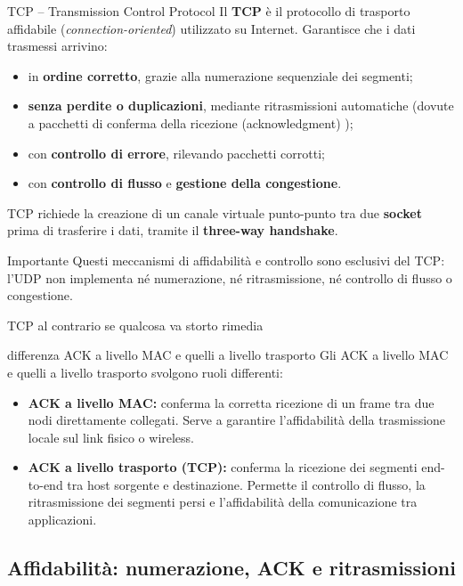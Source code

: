 \documentclass[a4paper,12pt]{report}
\begin{document}
\begin{defbox}{TCP -- Transmission Control Protocol}
Il \textbf{TCP} è il protocollo di trasporto affidabile (\textit{connection-oriented}) utilizzato su Internet.  
Garantisce che i dati trasmessi arrivino:
\begin{itemize}
    \item in \textbf{ordine corretto}, grazie alla numerazione sequenziale dei segmenti;
    \item \textbf{senza perdite o duplicazioni}, mediante ritrasmissioni automatiche (dovute a pacchetti di conferma della ricezione (acknowledgment) );
    \item con \textbf{controllo di errore}, rilevando pacchetti corrotti;
    \item con \textbf{controllo di flusso} e \textbf{gestione della congestione}.
\end{itemize}
TCP richiede la creazione di un canale virtuale punto-punto tra due \textbf{socket} prima di trasferire i dati, tramite il \textbf{three-way handshake}.
\end{defbox}

\begin{notebox}{Importante}
Questi meccanismi di affidabilità e controllo sono esclusivi del TCP: l'UDP non implementa né numerazione, né ritrasmissione, né controllo di flusso o congestione.

TCP al contrario se qualcosa va storto rimedia
\end{notebox}

\begin{notebox}{differenza  ACK a livello MAC e quelli a livello trasporto }
Gli ACK a livello MAC e quelli a livello trasporto svolgono ruoli differenti:

\begin{itemize}
    \item \textbf{ACK a livello MAC:} conferma la corretta ricezione di un frame tra due nodi direttamente collegati. Serve a garantire l'affidabilità della trasmissione locale sul link fisico o wireless.
    \item \textbf{ACK a livello trasporto (TCP):} conferma la ricezione dei segmenti end-to-end tra host sorgente e destinazione. Permette il controllo di flusso, la ritrasmissione dei segmenti persi e l'affidabilità della comunicazione tra applicazioni.
\end{itemize}
\end{notebox}

\subsection*{Affidabilità: numerazione, ACK e ritrasmissioni}
\end{document}
